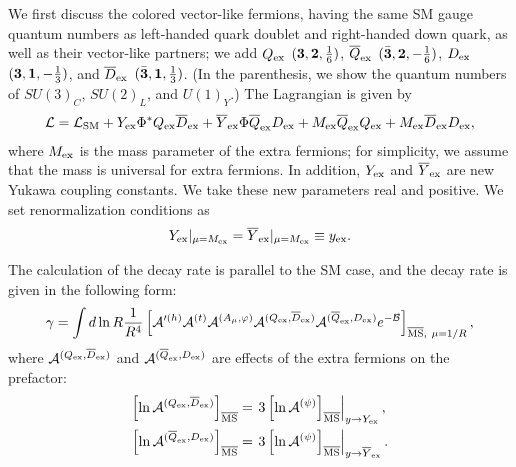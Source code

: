 \documentclass[12pt]{article}
\begin{document}
We first discuss the colored vector-like fermions, having the same SM
gauge quantum numbers as left-handed quark doublet and right-handed
down quark, as well as their vector-like partners; we add
$Q_{\rm ex}$ $({\bf 3}, {\bf 2},\frac{1}{6})$, 
$\overline{Q}_{\rm ex}$ $(\bar{\bf 3}, {\bf 2},-\frac{1}{6})$, 
$D_{\rm ex}$ $({\bf 3}, {\bf 1},-\frac{1}{3})$, and
$\overline{D}_{\rm ex}$ $(\bar{\bf 3}, {\bf 1},\frac{1}{3})$. 
(In the parenthesis, we show the quantum numbers of $SU(3)_C$,
$SU(2)_L$, and $U(1)_Y$.)   The Lagrangian is given by
\begin{align}
  \mathcal L = \mathcal L_{\rm SM}
  +Y_{\rm ex}\Phi^* Q_{\rm ex}\overline{D}_{\rm ex}
  +\overline{Y}_{\rm ex}\Phi\overline{Q}_{\rm ex}D_{\rm ex}
  +M_{\rm ex}\overline{Q}_{\rm ex}Q_{\rm ex}
  +M_{\rm ex}\overline{D}_{\rm ex}D_{\rm ex},
\end{align}
where $M_{\rm ex}$ is the mass parameter of the extra fermions; for
simplicity, we assume that the mass is universal for extra fermions.
In addition, $Y_{\rm ex}$ and $\overline{Y}_{\rm ex}$ are new Yukawa
coupling constants.  We take these new parameters real and positive.
We set renormalization conditions as
\begin{align}
  Y_{\rm ex}|_{\mu=M_{\rm ex}}
  = \overline{Y}_{\rm ex}|_{\mu=M_{\rm ex}}
  \equiv y_{\rm ex}.
  \label{eq_RGEboundary}
\end{align}


The calculation of the decay rate is parallel to the SM case, and the
decay rate is given in the following form:
\begin{align}
 \gamma = \int d\ln R \frac{1}{R^4}
 \left[
  \mathcal A'^{(h)}\mathcal A^{(t)}\mathcal A^{(A_\mu,\varphi)}
  \mathcal A^{(Q_{\rm ex},\overline{D}_{\rm ex})}
  \mathcal A^{(\overline{Q}_{\rm ex},D_{\rm ex})}
  e^{-\mathcal B}
 \right]_{\overline{\rm MS},~\mu=1/R},
\end{align}
where $\mathcal A^{(Q_{\rm ex},\overline{D}_{\rm ex})}$ and $\mathcal
A^{(\overline{Q}_{\rm ex},D_{\rm ex})}$ are effects of the extra
fermions on the prefactor:
\begin{align}
 \left[
  \ln \mathcal A^{(Q_{\rm ex},\overline{D}_{\rm ex})}
 \right]_{\overline{\rm MS}}
  & = \left.3
 \left[
  \ln \mathcal A^{(\psi)}
 \right]_{\overline{\rm MS}}
 \right|_{y\to Y_{\rm ex}}, \\
 \left[
  \ln \mathcal A^{(\overline{Q}_{\rm ex},D_{\rm ex})}
 \right]_{\overline{\rm MS}}
  & = \left.3
 \left[
  \ln \mathcal A^{(\psi)}
 \right]_{\overline{\rm MS}}
 \right|_{y\to \overline Y_{\rm ex}}.
\end{align}
\end{document}
